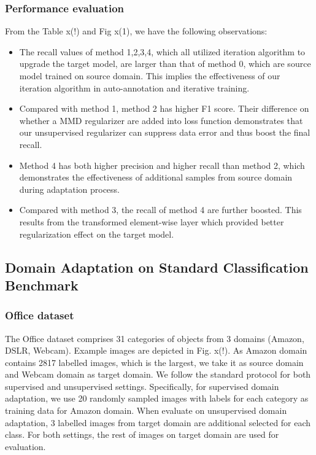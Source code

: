 \documentclass[runningheads]{llncs}
\begin{document}
\subsubsection{Performance evaluation}
From the Table x(!) and Fig x(1), we have the following observations:
\begin{itemize}
  \item The recall values of method 1,2,3,4, which all utilized iteration algorithm to upgrade the target model, are larger than that of method 0, which are source model trained on source domain. This implies the effectiveness of our iteration algorithm in auto-annotation and iterative training.
  \item Compared with method 1, method 2 has higher F1 score. Their difference on whether a MMD regularizer are added into loss function demonstrates that our unsupervised regularizer can suppress data error and thus boost the final recall.
  \item Method 4 has both higher precision and higher recall than method 2, which demonstrates the effectiveness of additional samples from source domain during adaptation process.
  \item Compared with method 3, the recall of method 4 are further boosted. This results from the transformed element-wise layer which provided better regularization effect on the target model.
\end{itemize}



\subsection{Domain Adaptation on Standard Classification Benchmark}

\subsubsection{Office dataset}
The Office dataset \cite{saenko2010adapting} comprises 31 categories of objects from 3 domains (Amazon, DSLR, Webcam). Example images are depicted in Fig. x(!). As Amazon domain contains 2817 labelled images, which is the largest, we take it as source domain and Webcam domain as target domain. We follow the standard protocol for both supervised and unsupervised settings. Specifically, for supervised domain adaptation, we use 20 randomly sampled images with labels for each category as training data for Amazon domain. When evaluate on unsupervised domain adaptation, 3 labelled images from target domain are additional selected for each class. For both settings, the rest of images on target domain are used for evaluation.
\end{document}
